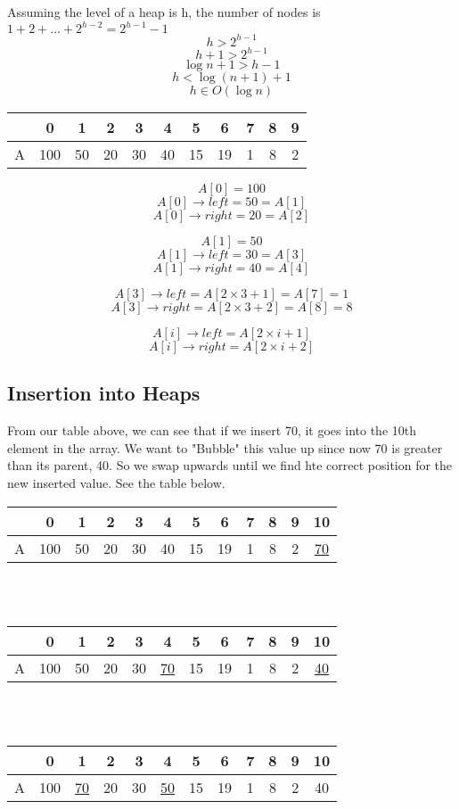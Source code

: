 \documentclass[12pt]{article}
\begin{document}
	Assuming the level of a heap is h, the number of nodes is $1 + 2 + ... + 2^{h-2} = 2^{h-1} - 1$\\
	$$h > 2^{h-1}$$
	$$h+1 > 2^{h-1}$$
	$$\log{n+1} > h - 1$$
	$$h < \log(n+1) + 1$$
	$$h \in O(\log{n})$$
	
	\begin{tabular}{c | c | c | c | c | c | c | c | c | c | c}
		& 0 & 1 & 2 & 3 & 4 & 5 & 6 & 7 & 8 & 9 \\ \hline
		A & 100 & 50 & 20 & 30 & 40 & 15 & 19 & 1 & 8 & 2 \\
	\end{tabular}
	
	$$A[0] = 100$$
	$$A[0]\rightarrow left = 50 = A[1]$$
	$$A[0]\rightarrow right = 20 = A[2]$$
	
	$$A[1] = 50$$
	$$A[1]\rightarrow left = 30 = A[3]$$
	$$A[1]\rightarrow right = 40 = A[4]$$
	
	$$A[3]\rightarrow left = A[2\times 3 + 1] = A[7] = 1$$
	$$A[3]\rightarrow right = A[2\times 3 + 2] = A[8] = 8$$
	
	$$A[i]\rightarrow left = A[2\times i + 1]$$
	$$A[i]\rightarrow right = A[2\times i + 2]$$
	
	\subsection*{Insertion into Heaps}
	From our table above, we can see that if we insert 70, it goes into the 10th element in the array. We want to "Bubble" this value up since now 70 is greater than its parent, 40. So we swap upwards until we find hte correct position for the new inserted value. See the table below.
	\begin{tabular}{c | c | c | c | c | c | c | c | c | c | c | c}
		& 0 & 1 & 2 & 3 & 4 & 5 & 6 & 7 & 8 & 9 & 10 \\ \hline
		A & 100 & 50 & 20 & 30 & 40 & 15 & 19 & 1 & 8 & 2 & \underline{70} \\
	\end{tabular}\\\\
	\begin{tabular}{c | c | c | c | c | c | c | c | c | c | c | c}
		& 0 & 1 & 2 & 3 & 4 & 5 & 6 & 7 & 8 & 9 & 10 \\ \hline
		A & 100 & 50 & 20 & 30 & \underline{70} & 15 & 19 & 1 & 8 & 2 & \underline{40} \\
	\end{tabular}\\\\
	\begin{tabular}{c | c | c | c | c | c | c | c | c | c | c | c}
		& 0 & 1 & 2 & 3 & 4 & 5 & 6 & 7 & 8 & 9 & 10 \\ \hline
		A & 100 & \underline{70} & 20 & 30 & \underline{50} & 15 & 19 & 1 & 8 & 2 & 40 \\
	\end{tabular}\\\\
	
\end{document}
